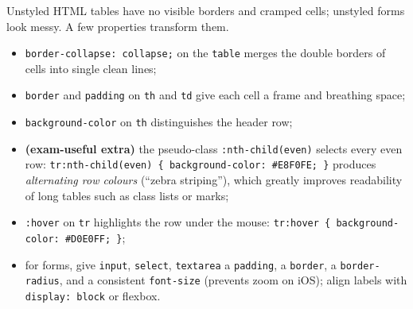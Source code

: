 \documentclass[11pt]{article}
\begin{document}
Unstyled HTML tables have no visible borders and cramped cells; unstyled forms look messy. A few properties transform them.

\begin{itemize}
\item \texttt{border-collapse: collapse;} on the \texttt{table} merges the double borders of cells into single clean lines;
\item \texttt{border} and \texttt{padding} on \texttt{th} and \texttt{td} give each cell a frame and breathing space;
\item \texttt{background-color} on \texttt{th} distinguishes the header row;
\item \textbf{(exam-useful extra)} the pseudo-class \texttt{:nth-child(even)} selects every even row: \texttt{tr:nth-child(even) \{ background-color: \#E8F0FE; \}} produces \emph{alternating row colours} (``zebra striping''), which greatly improves readability of long tables such as class lists or marks;
\item \texttt{:hover} on \texttt{tr} highlights the row under the mouse: \texttt{tr:hover \{ background-color: \#D0E0FF; \}};
\item for forms, give \texttt{input}, \texttt{select}, \texttt{textarea} a \texttt{padding}, a \texttt{border}, a \texttt{border-radius}, and a consistent \texttt{font-size} (prevents zoom on iOS); align labels with \texttt{display: block} or flexbox.
\end{itemize}
\end{document}
